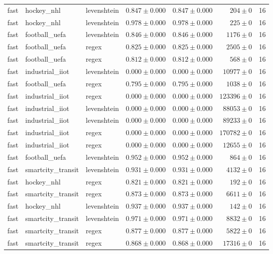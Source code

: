 \begin{table}[htbp]
\begin{tabular}{l l l r r r r}
fast & hockey\_nhl & levenshtein & $0.847\pm0.000$ & $0.847\pm0.000$ & $204\pm0$ & 16 \\
fast & hockey\_nhl & levenshtein & $0.978\pm0.000$ & $0.978\pm0.000$ & $225\pm0$ & 16 \\
fast & football\_uefa & levenshtein & $0.846\pm0.000$ & $0.846\pm0.000$ & $1176\pm0$ & 16 \\
fast & football\_uefa & regex & $0.825\pm0.000$ & $0.825\pm0.000$ & $2505\pm0$ & 16 \\
fast & football\_uefa & regex & $0.812\pm0.000$ & $0.812\pm0.000$ & $568\pm0$ & 16 \\
fast & industrial\_iiot & levenshtein & $0.000\pm0.000$ & $0.000\pm0.000$ & $10977\pm0$ & 16 \\
fast & football\_uefa & regex & $0.795\pm0.000$ & $0.795\pm0.000$ & $1038\pm0$ & 16 \\
fast & industrial\_iiot & regex & $0.000\pm0.000$ & $0.000\pm0.000$ & $123396\pm0$ & 16 \\
fast & industrial\_iiot & levenshtein & $0.000\pm0.000$ & $0.000\pm0.000$ & $88053\pm0$ & 16 \\
fast & industrial\_iiot & levenshtein & $0.000\pm0.000$ & $0.000\pm0.000$ & $89233\pm0$ & 16 \\
fast & industrial\_iiot & regex & $0.000\pm0.000$ & $0.000\pm0.000$ & $170782\pm0$ & 16 \\
fast & industrial\_iiot & regex & $0.000\pm0.000$ & $0.000\pm0.000$ & $12655\pm0$ & 16 \\
fast & football\_uefa & levenshtein & $0.952\pm0.000$ & $0.952\pm0.000$ & $864\pm0$ & 16 \\
fast & smartcity\_transit & levenshtein & $0.931\pm0.000$ & $0.931\pm0.000$ & $4132\pm0$ & 16 \\
fast & hockey\_nhl & regex & $0.821\pm0.000$ & $0.821\pm0.000$ & $192\pm0$ & 16 \\
fast & smartcity\_transit & regex & $0.873\pm0.000$ & $0.873\pm0.000$ & $6611\pm0$ & 16 \\
fast & hockey\_nhl & levenshtein & $0.937\pm0.000$ & $0.937\pm0.000$ & $142\pm0$ & 16 \\
fast & smartcity\_transit & levenshtein & $0.971\pm0.000$ & $0.971\pm0.000$ & $8832\pm0$ & 16 \\
fast & smartcity\_transit & regex & $0.877\pm0.000$ & $0.877\pm0.000$ & $5822\pm0$ & 16 \\
fast & smartcity\_transit & regex & $0.868\pm0.000$ & $0.868\pm0.000$ & $17316\pm0$ & 16 \\

\end{tabular}
\end{table}
